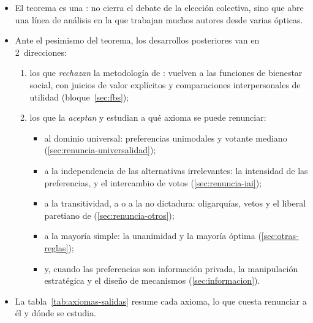 \documentclass[11pt]{article}
\begin{document}
\begin{itemize}
\item El teorema es una : no cierra el debate de la elección colectiva, sino que abre una línea de análisis en la que trabajan muchos autores desde varias ópticas.
\item Ante el pesimismo del teorema, los desarrollos posteriores van en 2~direcciones:
  \begin{enumerate}
  \item los que \emph{rechazan} la metodología de : vuelven a las funciones de bienestar social, con juicios de valor explícitos y comparaciones interpersonales de utilidad (bloque~\ref{sec:fbs});
  \item los que la \emph{aceptan} y estudian a qué axioma se puede renunciar:
    \begin{itemize}
    \item al dominio universal: preferencias unimodales y votante mediano (\ref{sec:renuncia-universalidad});
    \item a la independencia de las alternativas irrelevantes: la intensidad de las preferencias,  y el intercambio de votos (\ref{sec:renuncia-iai});
    \item a la transitividad, a  o a la no dictadura: oligarquías, vetos y el liberal paretiano de  (\ref{sec:renuncia-otros});
    \item a la mayoría simple: la unanimidad y la mayoría óptima (\ref{sec:otras-reglas});
    \item y, cuando las preferencias son información privada, la manipulación estratégica y el diseño de mecanismos (\ref{sec:informacion}).
    \end{itemize}
  \end{enumerate}
\item La tabla~\ref{tab:axiomas-salidas} resume cada axioma, lo que cuesta renunciar a él y dónde se estudia.
\end{itemize}
\end{document}
